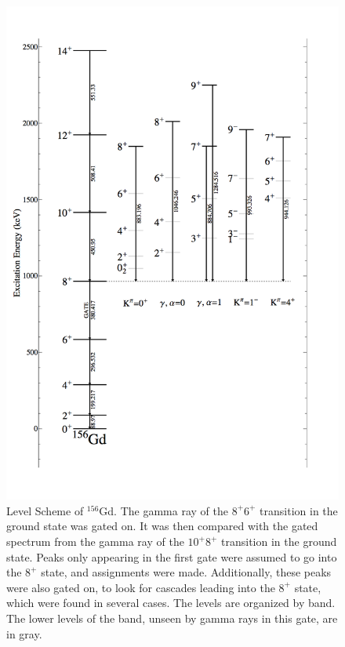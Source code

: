 \begin{figure}
    \centering
    \includegraphics[scale=0.3]{156GdTablesAndFigs/156Gd_8to6.png}
    \caption{Level Scheme of $^{156}$Gd. The gamma ray of the $8^+$\rightarrow$6^+$ transition in the ground state was gated on. It was then compared with the gated spectrum from the gamma ray of the $10^+$\rightarrow$8^+$ transition in the ground state. Peaks only appearing in the first gate were assumed to go into the $8^+$ state, and assignments were made. Additionally, these peaks were also gated on, to look for cascades leading into the $8^+$ state, which were found in several cases. The levels are organized by band. The lower levels of the band, unseen by gamma rays in this gate, are in gray.}
    \label{fig:156_8to6}
\end{figure}

